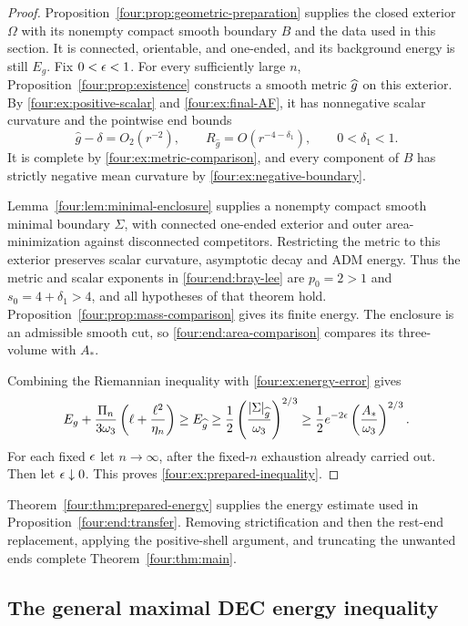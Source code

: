 \begin{proof}
Proposition~\ref{four:prop:geometric-preparation} supplies the closed
exterior $\Omega$ with its nonempty compact smooth boundary $B$ and
the data used in this section.  It is connected, orientable, and
one-ended, and its background energy is still $E_g$.  Fix
$0<\epsilon<1$.  For every sufficiently large $n$,
Proposition~\ref{four:prop:existence} constructs a smooth metric $\widehat g$
on this exterior. By \eqref{four:ex:positive-scalar} and
\eqref{four:ex:final-AF}, it has nonnegative scalar curvature and the
pointwise end bounds
\[
 \widehat g-\delta=O_2(r^{-2}),\qquad
 R_{\widehat g}=O(r^{-4-\delta_1}),\qquad 0<\delta_1<1.
\]
It is complete by \eqref{four:ex:metric-comparison}, and every component
of $B$ has strictly negative mean curvature by
\eqref{four:ex:negative-boundary}.

Lemma~\ref{four:lem:minimal-enclosure} supplies a nonempty compact smooth
minimal boundary $\Sigma$, with connected one-ended exterior and
outer area-minimization against disconnected competitors. Restricting
the metric to this exterior preserves scalar curvature, asymptotic
decay and ADM energy. Thus the metric and scalar exponents in
\eqref{four:end:bray-lee} are $p_0=2>1$ and
$s_0=4+\delta_1>4$, and all hypotheses of that theorem hold.
Proposition~\ref{four:prop:mass-comparison} gives its finite energy.
The enclosure is an admissible smooth cut, so
\eqref{four:end:area-comparison} compares its three-volume with $A_*$.

Combining the Riemannian inequality with \eqref{four:ex:energy-error} gives
\[
 E_g+\frac{\Pi_n}{3\omega_3}
                   \left(\ell+\frac{\ell^2}{\eta_n}\right)
 \ge E_{\widehat g}
 \ge\frac12\left(\frac{|\Sigma|_{\widehat g}}{\omega_3}\right)^{2/3}
 \ge\frac12e^{-2\epsilon}
                   \left(\frac{A_*}{\omega_3}\right)^{2/3}.
\]
For each fixed $\epsilon$ let $n\to\infty$, after the fixed-$n$ exhaustion
already carried out.  Then let $\epsilon\downarrow0$.  This proves
\eqref{four:ex:prepared-inequality}.
\end{proof}

Theorem~\ref{four:thm:prepared-energy} supplies the energy estimate used
in Proposition~\ref{four:end:transfer}. Removing strictification and then
the rest-end replacement, applying the positive-shell argument, and
truncating the unwanted ends complete Theorem~\ref{four:thm:main}.

\subsection{The general maximal DEC energy inequality}


